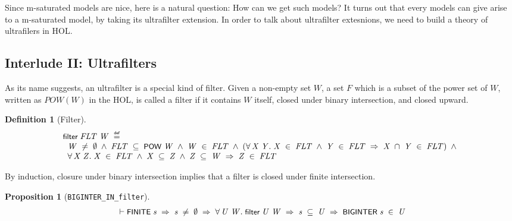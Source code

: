 \documentclass[letterpaper]{article}
\newtheorem{defn}{Definition}
\newtheorem{prop}{Proposition}
\renewcommand{\HOLConst}[1]{{\textsf{\upshape\small #1}}}
\newenvironment{holmath}{\begin{displaymath}\begin{array}{l}}{\end{array}\end{displaymath}\ignorespacesafterend}
\begin{document}
Since m-saturated models are nice, here is a natural question: How can we get such models? It turns out that every models can give arise to a m-saturated model, by taking its ultrafilter extension. In order to talk about ultrafilter extesnions, we need to build a theory of ultrafilers in HOL.

\subsection{Interlude II: Ultrafilters}

As its name suggests, an ultrafilter is a special kind of filter. Given a non-empty set $W$, a set $F$ which is a subset of the power set of $W$, written as $POW(W)$ in the HOL, is called a filter if it contains $W$ itself, closed under binary intersection, and closed upward.
\begin{defn}[Filter]
\begin{holmath}
  \HOLConst{filter}\;\HOLFreeVar{FLT}\;\HOLFreeVar{W}\;\HOLSymConst{\HOLTokenDefEquality{}}\\
\;\;\HOLFreeVar{W}\;\HOLSymConst{\HOLTokenNotEqual{}}\;\HOLSymConst{\HOLTokenEmpty{}}\;\HOLSymConst{\HOLTokenConj{}}\;\HOLFreeVar{FLT}\;\HOLSymConst{\HOLTokenSubset{}}\;\HOLConst{POW}\;\HOLFreeVar{W}\;\HOLSymConst{\HOLTokenConj{}}\;\HOLFreeVar{W}\;\HOLSymConst{\HOLTokenIn{}}\;\HOLFreeVar{FLT}\;\HOLSymConst{\HOLTokenConj{}}\;(\HOLSymConst{\HOLTokenForall{}}\HOLBoundVar{X}\;\HOLBoundVar{Y}.\;\HOLBoundVar{X}\;\HOLSymConst{\HOLTokenIn{}}\;\HOLFreeVar{FLT}\;\HOLSymConst{\HOLTokenConj{}}\;\HOLBoundVar{Y}\;\HOLSymConst{\HOLTokenIn{}}\;\HOLFreeVar{FLT}\;\HOLSymConst{\HOLTokenImp{}}\;\HOLBoundVar{X}\;\HOLSymConst{\HOLTokenInter{}}\;\HOLBoundVar{Y}\;\HOLSymConst{\HOLTokenIn{}}\;\HOLFreeVar{FLT})\;\HOLSymConst{\HOLTokenConj{}}\\
\;\;\HOLSymConst{\HOLTokenForall{}}\HOLBoundVar{X}\;\HOLBoundVar{Z}.\;\HOLBoundVar{X}\;\HOLSymConst{\HOLTokenIn{}}\;\HOLFreeVar{FLT}\;\HOLSymConst{\HOLTokenConj{}}\;\HOLBoundVar{X}\;\HOLSymConst{\HOLTokenSubset{}}\;\HOLBoundVar{Z}\;\HOLSymConst{\HOLTokenConj{}}\;\HOLBoundVar{Z}\;\HOLSymConst{\HOLTokenSubset{}}\;\HOLFreeVar{W}\;\HOLSymConst{\HOLTokenImp{}}\;\HOLBoundVar{Z}\;\HOLSymConst{\HOLTokenIn{}}\;\HOLFreeVar{FLT}
\end{holmath}
\end{defn}
By induction, closure under binary intersection implies that a filter is closed under finite intersection.
\begin{prop}[\texttt{BIGINTER_IN_filter}]
\begin{holmath}
  \ensuremath{\HOLTokenTurnstile}\HOLConst{FINITE}\;\HOLFreeVar{s}\;\HOLSymConst{\HOLTokenImp{}}\;\HOLFreeVar{s}\;\HOLSymConst{\HOLTokenNotEqual{}}\;\HOLSymConst{\HOLTokenEmpty{}}\;\HOLSymConst{\HOLTokenImp{}}\;\HOLSymConst{\HOLTokenForall{}}\HOLBoundVar{U}\;\HOLBoundVar{W}.\;\HOLConst{filter}\;\HOLBoundVar{U}\;\HOLBoundVar{W}\;\HOLSymConst{\HOLTokenImp{}}\;\HOLFreeVar{s}\;\HOLSymConst{\HOLTokenSubset{}}\;\HOLBoundVar{U}\;\HOLSymConst{\HOLTokenImp{}}\;\HOLConst{BIGINTER}\;\HOLFreeVar{s}\;\HOLSymConst{\HOLTokenIn{}}\;\HOLBoundVar{U}
\end{holmath}
\end{prop}
\end{document}

